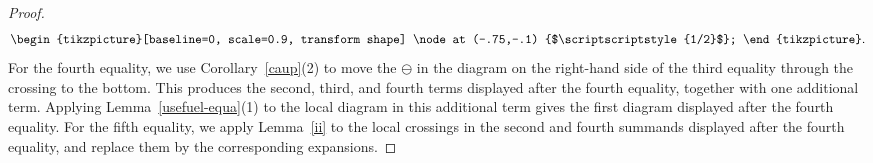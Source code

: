 \documentclass[a4,10pt]{amsart}
\numberwithin{equation}{section}
\theoremstyle{definition}
\begin{document}
\begin{proof}
\begin{equation}
\begin{aligned}
\begin{tikzpicture}[baseline=0, scale=0.9, transform shape]
  \node at (-.75,-.1) {$\scriptscriptstyle{1/2}$};
\end{tikzpicture} .
\end{aligned}
\end{equation}
For the fourth equality, we use Corollary~\ref{caup}(2) to move the
\(\ominus\) in the diagram on the right-hand side of the third equality
through the crossing to the bottom.  This produces the second, third,
and fourth terms displayed after the fourth equality, together with one
additional term.  Applying Lemma~\ref{usefuel-equa}(1) to the local
diagram in this additional term gives the first diagram displayed after
the fourth equality. For the fifth equality, we apply Lemma~\ref{ii} to the local crossings in
the second and fourth summands displayed after the fourth equality, and
replace them by the corresponding expansions.
\end{proof}
\end{document}
